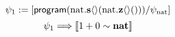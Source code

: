 \documentclass[10pt]{sigplanconf}
\begin{document}
%
%
$$\psi_{1} := \subst{\tprog{
	\eop{\text{nat}}{s}{}{\eop{\text{nat}}{z}{}{}}
}}{\psi_{\text{nat}}}$$
$$
\psi_{1} \Longrightarrow \llbracket 1 + 0 \sim {\textbf{nat}} \rrbracket
$$
%
\end{document}
